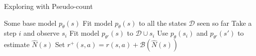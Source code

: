 \begin{algorithm}[t!]
\caption{Exploring with Pseudo-count}
\begin{algorithmic}[1]
\label{alg:pseudocount}
\REQUIRE Some base model $p_\theta(s)$
\STATE Fit model $p_\theta(s)$ to all the states $\mathcal{D}$ seen so far
\STATE Take a step $i$ and observe $s_i$
\STATE Fit model $p_{\theta'}(s)$ to $\mathcal{D}\cup s_i$
\STATE Use $p_\theta(s_i)$ and $p_{\theta'}(s')$ to estimate $\hat{N}(s)$
\STATE Set $r^+(s,a) = r(s,a) + \mathcal{B}(\hat{N}(s))$
\ENDWHILE
\end{algorithmic}
\end{algorithm}